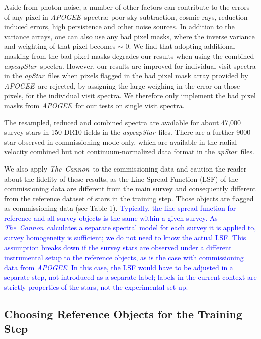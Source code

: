 \documentclass[12pt, preprint]{aastex}
\newcommand{\tc}{\textsl{The~Cannon}}
\newcommand{\apogee}{\textsl{APOGEE}}
\newcommand{\aspcapstar}{\textsl{aspcapStar}}
\newcommand{\apstar}{\textsl{apStar}}
\begin{document}
Aside from photon noise, a number of other factors can contribute to the errors of any pixel in \apogee\ spectra: poor sky subtraction, cosmic rays, reduction induced errors, high persistence and other noise sources. In addition to the variance arrays, one can also use any bad pixel masks, where the
inverse variance and weighting of that pixel becomes $\sim$ 0. We find that adopting additional masking from the bad pixel masks degrades our results when using the combined \aspcapstar\ spectra. However, our results are improved for individual visit spectra in the \apstar\ files when pixels flagged in the bad pixel mask array provided by \apogee\ are rejected, by assigning the large weighing in the error on those pixels, for the individual visit spectra. We therefore only implement the bad pixel masks from \apogee\ for our tests on single visit spectra. 

The resampled, reduced and combined spectra are available for about 47,000 survey stars in 150 DR10 fields in the \aspcapstar\ files. There are a further 9000 star observed in commissioning mode only, which are available in the radial velocity combined but not continuum-normalized data format in the \apstar\ files.

We also apply \tc\ to the commissioning data and caution the reader about the fidelity of these results, as the Line Spread Function (LSF) of the commissioning data are different from the main survey and consequently different from the reference dataset of stars in the training step. Those objects are flagged as commissioning data (see Table 1). 
\textcolor{blue}{Typically, the line spread function for reference and all survey objects is the same within a given survey. As \tc\ calculates a separate spectral model for each survey it is applied to, survey homogeneity is sufficient; we do not need to know the actual LSF. This assumption breaks down if the survey stars are observed under a different instrumental setup to the reference objects, as is the case with commissioning data from \apogee. In this case, the LSF would have to be adjusted in a separate step, not introduced as a separate label; labels in the current context are strictly properties of the stars, not the experimental set-up.}  

\subsection{Choosing Reference Objects for the Training Step}
\label{sec:ReferenceObjects}
\end{document}
